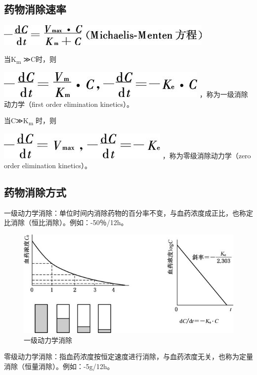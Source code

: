 \subsection{药物消除速率}

\includegraphics{./images/Image00045.jpg}

当K\textsubscript{m} ≫C时，则

\includegraphics{./images/Image00046.jpg} ，称为一级消除动力学（first
order elimination kinetics）。

当C≫K\textsubscript{m} 时，则

\includegraphics{./images/Image00047.jpg} ，称为零级消除动力学（zero
order elimination kinetics）。

\subsection{药物消除方式}

一级动力学消除：单位时间内消除药物的百分率不变，与血药浓度成正比，也称定比消除（恒比消除）。例如：-50％/12h。

\begin{figure}[!htbp]
 \centering
 \includegraphics{./images/Image00048.jpg}
 \captionsetup{justification=centering}
 \caption{一级动力学消除}
 \label{fig3-15}
  \end{figure} 

零级动力学消除：指血药浓度按恒定速度进行消除，与血药浓度无关，也称为定量消除（恒量消除）。例如：-5g/12h。

